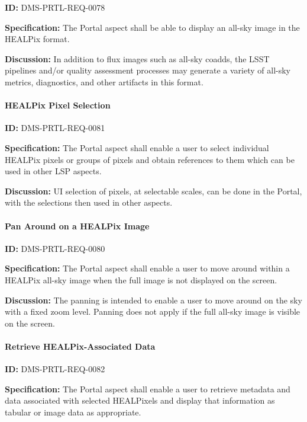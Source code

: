 \documentclass[SE,toc,lsstdraft]{lsstdoc}
\begin{document}
\label{DMS-PRTL-REQ-0078}
\textbf{ID:} DMS-PRTL-REQ-0078

\textbf{Specification:}
The Portal aspect shall be able to display an all-sky image in the HEALPix format.

\textbf{Discussion:}
In addition to flux images such as all-sky coadds, the LSST pipelines and/or quality assessment processes may generate a variety of all-sky metrics, diagnostics, and other artifacts in this format.

\paragraph{HEALPix Pixel Selection}\hfill  %

\label{DMS-PRTL-REQ-0081}
\textbf{ID:} DMS-PRTL-REQ-0081

\textbf{Specification:}
The Portal aspect shall enable a user to select individual HEALPix pixels or groups of pixels and obtain references to them which can be used in other LSP aspects.

\textbf{Discussion:}
UI selection of pixels, at selectable scales, can be done in the Portal, with the selections then used in other aspects.

\paragraph{Pan Around on a HEALPix Image}\hfill  %

\label{DMS-PRTL-REQ-0080}
\textbf{ID:} DMS-PRTL-REQ-0080

\textbf{Specification:}
The Portal aspect shall enable a user to move around within a HEALPix all-sky image when the full image is not displayed on the screen.

\textbf{Discussion:}
The panning is intended to enable a user to move around on the sky with a fixed zoom level.  Panning does not apply if the full all-sky image is visible on the screen.

\paragraph{Retrieve HEALPix-Associated Data}\hfill  %

\label{DMS-PRTL-REQ-0082}
\textbf{ID:} DMS-PRTL-REQ-0082

\textbf{Specification:}
The Portal aspect shall enable a user to retrieve metadata and data associated with selected HEALPixels and display that information as tabular or image data as appropriate.
\end{document}
